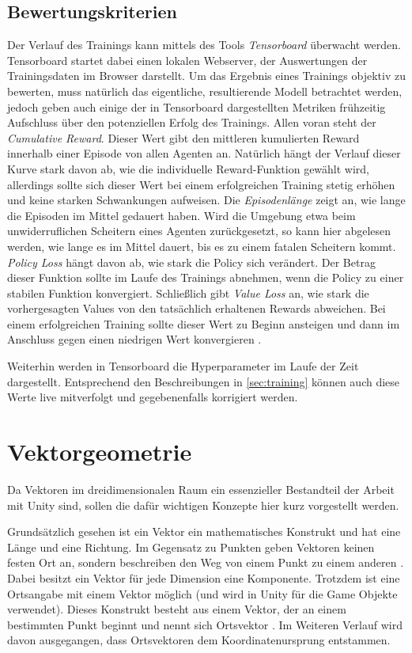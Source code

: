 \subsection{Bewertungskriterien}
\label{sec:bewertung}
Der Verlauf des Trainings kann mittels des Tools \emph{Tensorboard} überwacht werden.
Tensorboard startet dabei einen lokalen Webserver, der Auswertungen der Trainingsdaten im Browser darstellt.
Um das Ergebnis eines Trainings objektiv zu bewerten, muss natürlich das eigentliche, resultierende Modell betrachtet werden, jedoch geben auch einige der in Tensorboard dargestellten Metriken frühzeitig Aufschluss über den potenziellen Erfolg des Trainings.
Allen voran steht der \emph{Cumulative Reward}.
Dieser Wert gibt den mittleren kumulierten Reward innerhalb einer Episode von allen Agenten an.
Natürlich hängt der Verlauf dieser Kurve stark davon ab, wie die individuelle Reward-Funktion gewählt wird, allerdings sollte sich dieser Wert bei einem erfolgreichen Training stetig erhöhen und keine starken Schwankungen aufweisen.
Die \emph{Episodenlänge} zeigt an, wie lange die Episoden im Mittel gedauert haben.
Wird die Umgebung etwa beim unwiderruflichen Scheitern eines Agenten zurückgesetzt, so kann hier abgelesen werden, wie lange es im Mittel dauert, bis es zu einem fatalen Scheitern kommt.
\emph{Policy Loss} hängt davon ab, wie stark die Policy sich verändert.
Der Betrag dieser Funktion sollte im Laufe des Trainings abnehmen, wenn die Policy zu einer stabilen Funktion konvergiert.
Schließlich gibt \emph{Value Loss} an, wie stark die vorhergesagten Values von den tatsächlich erhaltenen Rewards abweichen.
Bei einem erfolgreichen Training sollte dieser Wert zu Beginn ansteigen und dann im Anschluss gegen einen niedrigen Wert konvergieren \cite{aurelian2018,untiyMetrics}.

Weiterhin werden in Tensorboard die Hyperparameter im Laufe der Zeit dargestellt.
Entsprechend den Beschreibungen in \autoref{sec:training} können auch diese Werte live mitverfolgt und gegebenenfalls korrigiert werden.


\section{Vektorgeometrie}
Da Vektoren im dreidimensionalen Raum ein essenzieller Bestandteil der Arbeit mit Unity sind, sollen die dafür wichtigen Konzepte hier kurz vorgestellt werden.

Grundsätzlich gesehen ist ein Vektor ein mathematisches Konstrukt und hat eine Länge und eine Richtung.
Im Gegensatz zu Punkten geben Vektoren keinen festen Ort an, sondern beschreiben den Weg von einem Punkt zu einem anderen \cite[6]{kohn2012}.
Dabei besitzt ein Vektor für jede Dimension eine Komponente.
Trotzdem ist eine Ortsangabe mit einem Vektor möglich (und wird in Unity für die Game Objekte verwendet).
Dieses Konstrukt besteht aus einem Vektor, der an einem bestimmten Punkt beginnt und nennt sich Ortsvektor \cite[21]{kohn2012}.
Im Weiteren Verlauf wird davon ausgegangen, dass Ortsvektoren dem Koordinatenursprung entstammen.

